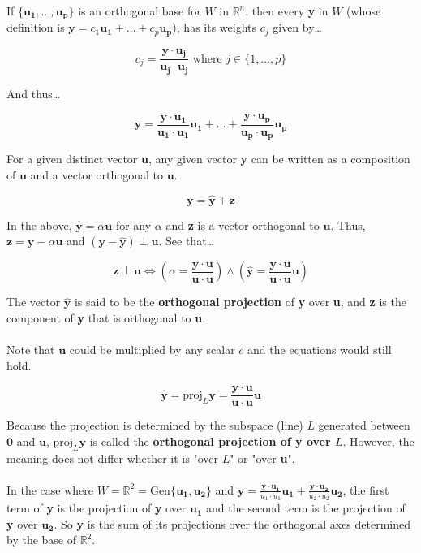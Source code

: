 \documentclass[12pt]{article}
\newcommand{\gen}[1]{\mathrm{Gen}\{{#1}\}}
\newcommand{\R}{\mathbb{R}}
\newcommand{\bt}[1]{\textbf{{#1}}}
\newcommand{\bm}[1]{\mathbf{{#1}}}
\newcommand{\set}[1]{\{{#1}\}}
\begin{document}
If $\set{\bm{u_1,\dots,u_p}}$ is an orthogonal base for $W$ in $\R^n$, then every \bt{y} in $W$
(whose definition is $\bm{y} = c_1\bm{u_1} + \dots + c_p\bm{u_p}$), has its weights $c_j$ given by\dots

$$c_j = \frac{\bm{y \cdot u_j}}{\bm{u_j \cdot u_j}} \textrm{ where } j \in \set{1, \dots, p}$$

And thus\dots

$$\bm{y} = \frac{\bm{y \cdot u_1}}{\bm{u_1 \cdot u_1}}\bm{u_1} + \dots + \frac{\bm{y \cdot u_p}}{\bm{u_p \cdot u_p}}\bm{u_p}$$

For a given distinct vector \bt{u}, any given vector \bt{y} can be written as a composition
of $\bm{u}$ and a vector orthogonal to $\bm{u}$.

$$\bm{y = \hat{y} + z}$$

In the above, $\bm{\hat{y}} = \alpha \bm{u}$ for any $\alpha$ and \bt{z} is a vector orthogonal to $\bm{u}$.
Thus, $\bm{z} = \bm{y} - \alpha\bm{u}$ and $(\bm{y - \hat{y}})\perp\bm{u}$. See that\dots

$$\bm{z \perp u} \iff (\alpha = \frac{\bm{y \cdot u}}{\bm{u \cdot u}})\land(\bm{\hat{y}} = \frac{\bm{y \cdot u}}{\bm{u \cdot u}}\bm{u})$$

The vector $\bm{\hat{y}}$ is said to be the \bt{orthogonal projection} of \bt{y} over \bt{u}, and \bt{z} is the component
of \bt{y} that is orthogonal to \bt{u}. \\ \\

Note that $\bm{u}$ could be multiplied by any scalar $c$ and the equations would still hold.

$$\bm{\hat{y}} = \textrm{proj}_L\bm{y} = \frac{\bm{y \cdot u}}{\bm{u \cdot u}}\bm{u}$$

Because the projection is determined by the subspace (line) $L$ generated between $\bm{0}$ and $\bm{u}$,
$\textrm{proj}_L\bm{y}$ is called the \bt{orthogonal projection of y over $L$}. However, the meaning
does not differ whether it is "over $L$" or "over \bt{u}". \\ \\

In the case where $W = \R^2 = \gen{\bm{u_1, u_2}}$ and
$\bm{y} = \frac{\bm{y \cdot u_1}}{u_1 \cdot u_1}\bm{u_1} + \frac{\bm{y \cdot u_2}}{u_2 \cdot u_2}\bm{u_2}$,
the first term of \bt{y} is the projection of \bt{y} over $\bm{u_1}$ and the second term is the projection of \bt{y} over $\bm{u_2}$. So
\bt{y} is the sum of its projections over the orthogonal axes determined by the base of $\R^2$. \\ \\
\end{document}
